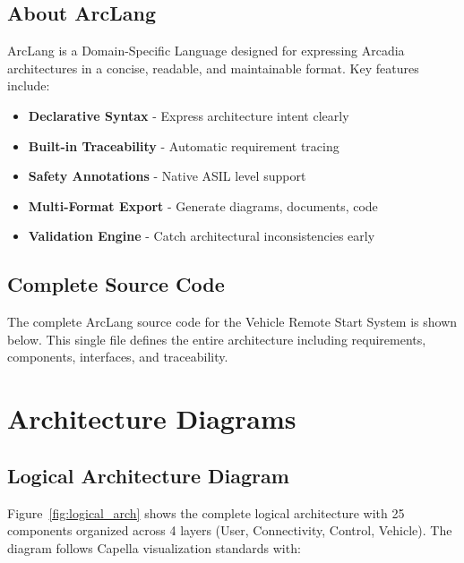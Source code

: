 \documentclass[11pt,a4paper]{article}
\begin{document}
\subsection{About ArcLang}
ArcLang is a Domain-Specific Language designed for expressing Arcadia architectures in a concise, readable, and maintainable format. Key features include:
\begin{itemize}[leftmargin=*]
    \item \textbf{Declarative Syntax} - Express architecture intent clearly
    \item \textbf{Built-in Traceability} - Automatic requirement tracing
    \item \textbf{Safety Annotations} - Native ASIL level support
    \item \textbf{Multi-Format Export} - Generate diagrams, documents, code
    \item \textbf{Validation Engine} - Catch architectural inconsistencies early
\end{itemize}

\subsection{Complete Source Code}

The complete ArcLang source code for the Vehicle Remote Start System is shown below. This single file defines the entire architecture including requirements, components, interfaces, and traceability.



\section{Architecture Diagrams}

\subsection{Logical Architecture Diagram}

Figure~\ref{fig:logical_arch} shows the complete logical architecture with 25 components organized across 4 layers (User, Connectivity, Control, Vehicle). The diagram follows Capella visualization standards with:
\end{document}
